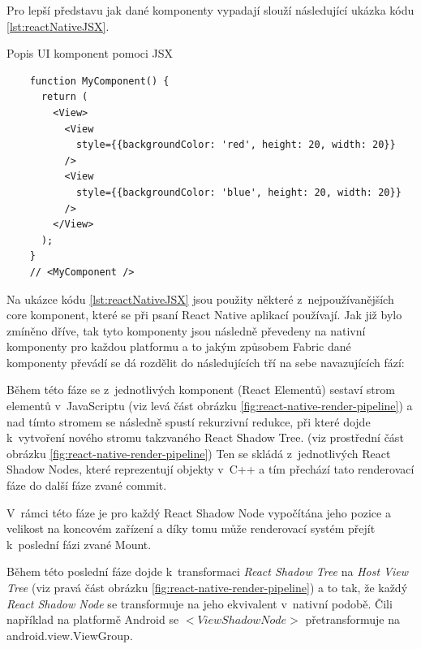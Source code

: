 Pro lepší představu jak dané komponenty vypadají slouží následující ukázka kódu \ref{lst:reactNativeJSX}.

\begin{listing}[H]
\caption{Popis UI komponent pomoci JSX}\label{lst:reactNativeJSX}
\begin{verbatim}
    function MyComponent() {
      return (
        <View>
          <View
            style={{backgroundColor: 'red', height: 20, width: 20}}
          />
          <View
            style={{backgroundColor: 'blue', height: 20, width: 20}}
          />
        </View>
      );
    }
    // <MyComponent />
\end{verbatim}
\end{listing}




Na ukázce kódu \ref{lst:reactNativeJSX} jsou použity některé z~nejpoužívanějších core komponent, které se při psaní React
Native aplikací používají. \cite{reactNativeComponents} Jak již bylo zmíněno dříve, tak tyto komponenty jsou následně převedeny 
na nativní komponenty pro každou platformu a to jakým způsobem Fabric dané komponenty převádí se dá rozdělit do následujících tří
na sebe navazujících fází: \cite{reactNativeRenderCommitMount}
 

\smallskip

Během této fáze se z~jednotlivých komponent (React Elementů) sestaví strom elementů v~JavaScriptu (viz levá část obrázku \ref{fig:react-native-render-pipeline}) a nad tímto stromem se 
následně spustí rekurzivní redukce, při které dojde k~vytvoření nového stromu takzvaného React Shadow Tree. (viz prostřední část obrázku \ref{fig:react-native-render-pipeline})
\cite{reactNativeRenderCommitMount} Ten se skládá z~jednotlivých React Shadow Nodes, které reprezentují objekty v~C++ a tím přechází tato renderovací fáze do další fáze zvané commit.\cite{reactNativeRenderCommitMount}

V~rámci této fáze je pro každý React Shadow Node vypočítána jeho pozice a velikost na koncovém zařízení a díky tomu může renderovací systém
přejít k~poslední fázi zvané Mount. \cite{reactNativeRenderCommitMount}

Během této poslední fáze dojde k~transformaci \textit{React Shadow Tree} na \textit{Host View Tree} (viz pravá část obrázku \ref{fig:react-native-render-pipeline}) a to tak, že každý \textit{React Shadow Node}
se transformuje na jeho ekvivalent v~nativní podobě. \cite{reactNativeRenderCommitMount} Čili například na platformě Android se $<ViewShadowNode>$ přetransformuje na android.view.ViewGroup. \cite{reactNativeRenderCommitMount}

